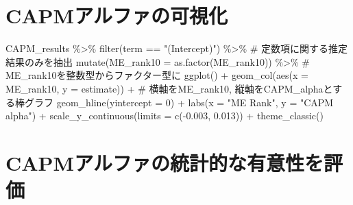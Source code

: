 \documentclass[
  letterpaper,
  DIV=11,
  numbers=noendperiod]{scrreprt}
\newenvironment{Shaded}{\begin{snugshade}}{\end{snugshade}}
\newcommand{\AttributeTok}[1]{\textcolor[rgb]{0.40,0.45,0.13}{#1}}
\newcommand{\CommentTok}[1]{\textcolor[rgb]{0.37,0.37,0.37}{#1}}
\newcommand{\DecValTok}[1]{\textcolor[rgb]{0.68,0.00,0.00}{#1}}
\newcommand{\FloatTok}[1]{\textcolor[rgb]{0.68,0.00,0.00}{#1}}
\newcommand{\FunctionTok}[1]{\textcolor[rgb]{0.28,0.35,0.67}{#1}}
\newcommand{\NormalTok}[1]{\textcolor[rgb]{0.00,0.23,0.31}{#1}}
\newcommand{\SpecialCharTok}[1]{\textcolor[rgb]{0.37,0.37,0.37}{#1}}
\newcommand{\StringTok}[1]{\textcolor[rgb]{0.13,0.47,0.30}{#1}}
\begin{document}
\section{CAPMアルファの可視化}\label{capmux30a2ux30ebux30d5ux30a1ux306eux53efux8996ux5316}

\begin{Shaded}
\begin{Highlighting}[]
\NormalTok{CAPM\_results }\SpecialCharTok{\%\textgreater{}\%} 
  \FunctionTok{filter}\NormalTok{(term }\SpecialCharTok{==} \StringTok{"(Intercept)"}\NormalTok{) }\SpecialCharTok{\%\textgreater{}\%} \CommentTok{\# 定数項に関する推定結果のみを抽出}
  \FunctionTok{mutate}\NormalTok{(}\AttributeTok{ME\_rank10 =} \FunctionTok{as.factor}\NormalTok{(ME\_rank10)) }\SpecialCharTok{\%\textgreater{}\%} \CommentTok{\# ME\_rank10を整数型からファクター型に}
  \FunctionTok{ggplot}\NormalTok{() }\SpecialCharTok{+}
  \FunctionTok{geom\_col}\NormalTok{(}\FunctionTok{aes}\NormalTok{(}\AttributeTok{x =}\NormalTok{ ME\_rank10, }\AttributeTok{y =}\NormalTok{ estimate)) }\SpecialCharTok{+} \CommentTok{\# 横軸をME\_rank10, 縦軸をCAPM\_alphaとする棒グラフ}
  \FunctionTok{geom\_hline}\NormalTok{(}\AttributeTok{yintercept =} \DecValTok{0}\NormalTok{) }\SpecialCharTok{+} 
  \FunctionTok{labs}\NormalTok{(}\AttributeTok{x =} \StringTok{"ME Rank"}\NormalTok{, }\AttributeTok{y =} \StringTok{"CAPM alpha"}\NormalTok{) }\SpecialCharTok{+} 
  \FunctionTok{scale\_y\_continuous}\NormalTok{(}\AttributeTok{limits =} \FunctionTok{c}\NormalTok{(}\SpecialCharTok{{-}}\FloatTok{0.003}\NormalTok{, }\FloatTok{0.013}\NormalTok{)) }\SpecialCharTok{+}
  \FunctionTok{theme\_classic}\NormalTok{()}
\end{Highlighting}
\end{Shaded}

\section{CAPMアルファの統計的な有意性を評価}\label{capmux30a2ux30ebux30d5ux30a1ux306eux7d71ux8a08ux7684ux306aux6709ux610fux6027ux3092ux8a55ux4fa1}
\end{document}
